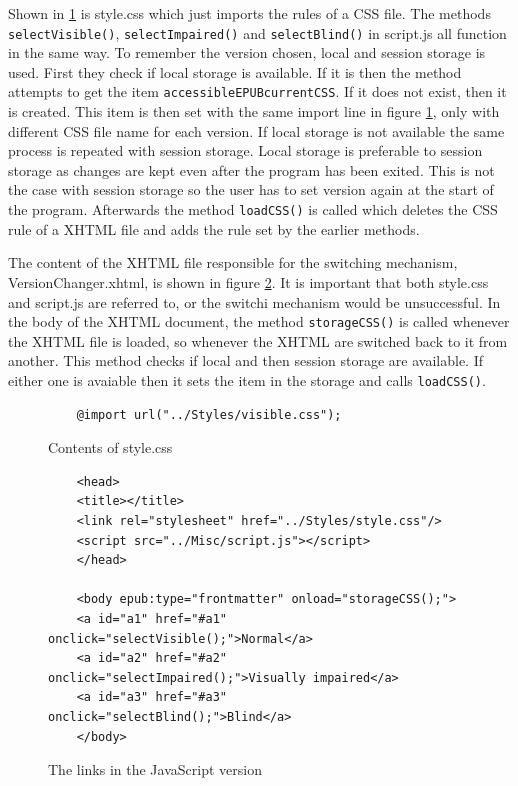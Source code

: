 Shown in \ref{fig:jsStyleCss} is style.css which just imports the rules of a CSS file. The methods \lstinline|selectVisible()|, \lstinline|selectImpaired()| and \lstinline|selectBlind()| in script.js all function in the same way. To remember the version chosen, local and session storage is used. First they check if local storage is available. If it is then the method attempts to get the item \lstinline|accessibleEPUBcurrentCSS|. If it does not exist, then it is created. This item is then set with the same import line in figure \ref{fig:jsStyleCss}, only with different CSS file name for each version. If local storage is not available the same process is repeated with session storage. Local storage is preferable to session storage as changes are kept even after the program has been exited. This is not the case with session storage so the user has to set version again at the start of the program. Afterwards the method \lstinline|loadCSS()| is called which deletes the CSS rule of a XHTML file and adds the rule set by the earlier methods.

The content of the XHTML file responsible for the switching mechanism, VersionChanger.xhtml, is shown in figure \ref{fig:js_switch}. It is important that both style.css and script.js are referred to, or the switchi mechanism would be unsuccessful. In the body of the XHTML document, the method \lstinline{storageCSS()} is called whenever the XHTML file is loaded, so whenever the XHTML are switched back to it from another. This method checks if local and then session storage are available. If either one is avaiable then it sets the item in the storage and calls \lstinline{loadCSS()}.

\begin{figure}
	
	\begin{lstlisting}
	@import url("../Styles/visible.css");
	\end{lstlisting}
	\caption{Contents of style.css}
	\label{fig:jsStyleCss}
\end{figure}

\begin{figure}
	
	\begin{lstlisting}
	<head>
	<title></title>
	<link rel="stylesheet" href="../Styles/style.css"/>
	<script src="../Misc/script.js"></script>
	</head>
	
	<body epub:type="frontmatter" onload="storageCSS();">
	<a id="a1" href="#a1" onclick="selectVisible();">Normal</a>
	<a id="a2" href="#a2" onclick="selectImpaired();">Visually impaired</a>
	<a id="a3" href="#a3" onclick="selectBlind();">Blind</a>
	</body>
	\end{lstlisting}
	\caption{The links in the JavaScript version}
	\label{fig:js_switch}
\end{figure}

